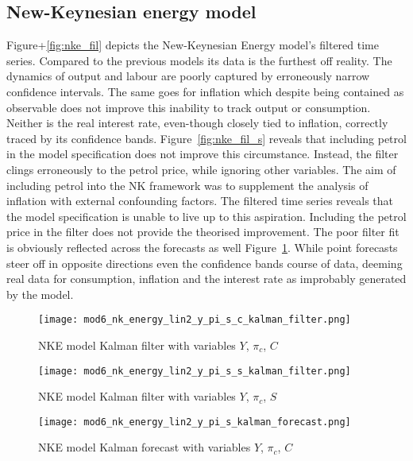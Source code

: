 \documentclass[12pt,a4paper,english]{article} %
\begin{document}
	\subsection{New-Keynesian energy model}
	Figure+\ref{fig:nke_fil} depicts the New-Keynesian Energy model's filtered time series. Compared to the previous models its data is the furthest off reality. The dynamics of output and labour are poorly captured by erroneously narrow confidence intervals. The same goes for inflation which despite being contained as observable does not improve this inability to track output or consumption. Neither is the real interest rate, even-though closely tied to inflation, correctly traced by its confidence bands. Figure~\ref{fig:nke_fil_s} reveals that including petrol in the model specification does not improve this circumstance. Instead, the filter clings erroneously to the petrol price, while ignoring other variables. The aim of including petrol into the NK framework was to supplement the analysis of inflation with external confounding factors. The filtered time series reveals that the model specification is unable to live up to this aspiration. Including the petrol price in the filter does not provide the theorised improvement.
	The poor filter fit is obviously reflected across the forecasts as well Figure~\ref{fig:nke_for}. While point forecasts steer off in opposite directions even the confidence bands course of data, deeming real data for consumption, inflation and the interest rate as improbably generated by the model.
	\begin{figure}[H]
		\begin{center}
			\texttt{[image: mod6\_nk\_energy\_lin2\_y\_pi\_s\_c\_kalman\_filter.png]}
			\caption{NKE model Kalman filter with variables $Y$, $\pi_c$, $C$}\label{fig:nke_fil}			
			\texttt{[image: mod6\_nk\_energy\_lin2\_y\_pi\_s\_s\_kalman\_filter.png]}
			\caption{NKE model Kalman filter with variables $Y$, $\pi_c$, $S$}\label{fig:nke_fil_s}
			\texttt{[image: mod6\_nk\_energy\_lin2\_y\_pi\_s\_kalman\_forecast.png]}
			\caption{NKE model Kalman forecast with variables $Y$, $\pi_c$, $C$}\label{fig:nke_for}
		\end{center}
	\end{figure}
\end{document}
